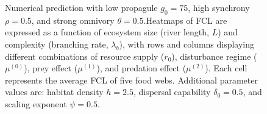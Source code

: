 \begin{figure}
\centering
{}
\caption{\label{fig:fig-num7}Numerical prediction with low propagule
\(g_0 = 75\), high synchrony \(\rho = 0.5\), and strong omnivory
\(\theta = 0.5\).Heatmaps of FCL are expressed as a function of
ecosystem size (river length, \(L\)) and complexity (branching rate,
\(\lambda_b\)), with rows and columns displaying different combinations
of resource supply (\(r_0\)), disturbance regime (\(\mu^{(0)}\)), prey
effect (\(\mu^{(1)}\)), and predation effect (\(\mu^{(2)}\)). Each cell
represents the average FCL of five food webs. Additional parameter
values are: habitat density \(h=2.5\), dispersal capability
\(\delta_0=0.5\), and scaling exponent \(\psi=0.5\).}
\end{figure}

\newpage


